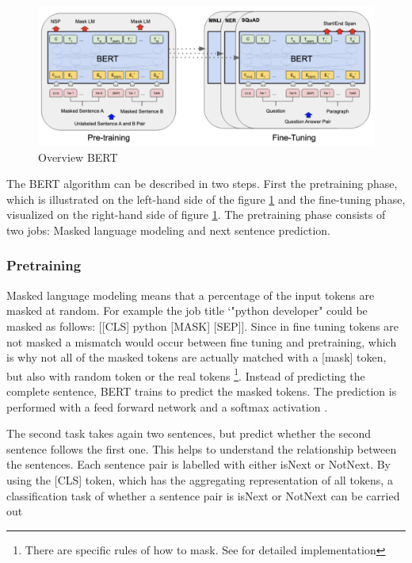 \documentclass[12pt, a4paper, titlepage]{article}
\begin{document}
\begin{figure}[hb!]
  \center
  \includegraphics[scale=0.5]{BERTOverview.png}
  \caption{\label{fig: F3} Overview \ac{BERT} \citep[3]{devlin2018}}
\end{figure}


The \ac{BERT} algorithm can be described in two steps. First the pretraining phase, which is illustrated on the left-hand side of the figure \ref{fig: F3} and the fine-tuning phase, visualized on the right-hand side of figure \ref{fig: F3}. The pretraining phase consists of two jobs: Masked language modeling and next sentence prediction. 

\subsubsection*{Pretraining}
Masked language modeling means that a percentage of the input tokens are masked at random. For example the job title `"python developer" could be masked as follows: [[CLS] python [MASK] [SEP]]. Since in fine tuning tokens are not masked a mismatch would occur between fine tuning and pretraining, which is why not all of the masked tokens are actually matched with a [mask] token, but also with random token or the real tokens \footnote{There are specific rules of how to mask. See \citet{devlin2018} for detailed implementation}. Instead of predicting the complete sentence, BERT trains to predict the masked tokens. The prediction is performed with a feed forward network and a softmax activation \citep{devlin2018,ravichandiran2021}. 

The second task takes again two sentences, but predict whether the second sentence follows the first one. This helps to understand the relationship between the sentences. Each sentence pair is labelled with either isNext or NotNext. By using the [CLS] token, which has the aggregating representation of all tokens, a classification task of whether a sentence pair is isNext or NotNext can be carried out \citep{ravichandiran2021,devlin2018}
\end{document}
